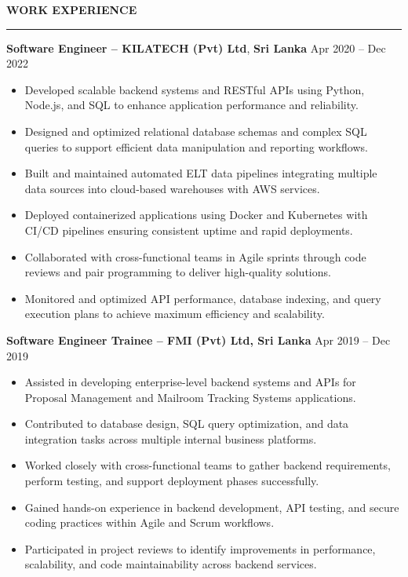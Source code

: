 \documentclass[10pt,letterpaper]{article}
\begin{document}
\vspace{8pt}

\textbf{WORK EXPERIENCE}\\[-8pt]
\noindent\rule{\textwidth}{1pt}

\vspace{-2pt}

\textbf{Software Engineer -- KILATECH (Pvt) Ltd}, \textbf{Sri Lanka} \hfill Apr 2020 -- Dec 2022

\vspace{-1pt}

\begin{itemize}
\item Developed scalable backend systems and RESTful APIs using Python, Node.js, and SQL to enhance application performance and reliability.
\item Designed and optimized relational database schemas and complex SQL queries to support efficient data manipulation and reporting workflows.
\item Built and maintained automated ELT data pipelines integrating multiple data sources into cloud-based warehouses with AWS services.
\item Deployed containerized applications using Docker and Kubernetes with CI/CD pipelines ensuring consistent uptime and rapid deployments.
\item Collaborated with cross-functional teams in Agile sprints through code reviews and pair programming to deliver high-quality solutions.
\item Monitored and optimized API performance, database indexing, and query execution plans to achieve maximum efficiency and scalability.
\end{itemize}

\textbf{Software Engineer Trainee -- FMI (Pvt) Ltd, Sri Lanka} \hfill Apr 2019 -- Dec 2019

\vspace{-1pt}

\begin{itemize}
\item Assisted in developing enterprise-level backend systems and APIs for Proposal Management and Mailroom Tracking Systems applications.
\item Contributed to database design, SQL query optimization, and data integration tasks across multiple internal business platforms.
\item Worked closely with cross-functional teams to gather backend requirements, perform testing, and support deployment phases successfully.
\item Gained hands-on experience in backend development, API testing, and secure coding practices within Agile and Scrum workflows.
\item Participated in project reviews to identify improvements in performance, scalability, and code maintainability across backend services.
\end{itemize}
\end{document}
